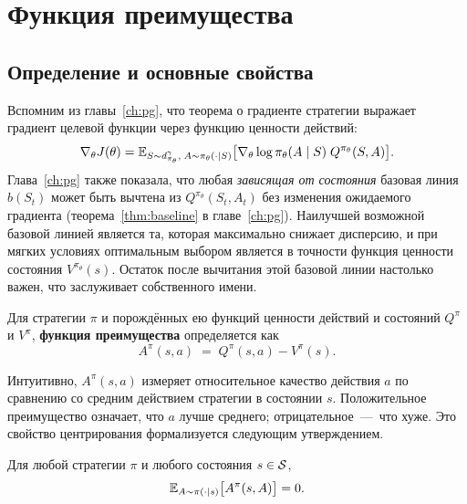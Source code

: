 \section{Функция преимущества}
\label{sec:advantage}

\subsection{Определение и основные свойства}

Вспомним из главы~\ref{ch:pg}, что теорема о градиенте стратегии выражает градиент целевой функции через функцию ценности действий:
\begin{equation}
\label{eq:pg-theorem-repeat}
\nabla_\theta J(\theta)
= \operatorname{\mathbb{E}}_{S \sim d^\gamma_{\pi_\theta},\; A \sim \pi_\theta(\cdot|S)}
  \bigl[\nabla_\theta \log \pi_\theta(A \mid S)\; Q^{\pi_\theta}(S, A)\bigr].
\end{equation}
Глава~\ref{ch:pg} также показала, что любая \emph{зависящая от состояния} базовая линия $b(S_t)$ может быть вычтена из $Q^{\pi_\theta}(S_t, A_t)$ без изменения ожидаемого градиента (теорема~\ref{thm:baseline} в главе~\ref{ch:pg}). Наилучшей возможной базовой линией является та, которая максимально снижает дисперсию, и при мягких условиях оптимальным выбором является в точности функция ценности состояния $V^{\pi_\theta}(s)$. Остаток после вычитания этой базовой линии настолько важен, что заслуживает собственного имени.

\begin{definition}
\label{def:advantage-ch9}
Для стратегии $\pi$ и порождённых ею функций ценности действий и состояний $Q^\pi$ и $V^\pi$, \textbf{функция преимущества} определяется как
\begin{equation}
\label{eq:advantage-def}
A^\pi(s, a) \;=\; Q^\pi(s, a) - V^\pi(s).
\end{equation}
\end{definition}

Интуитивно, $A^\pi(s,a)$ измеряет относительное качество действия $a$ по сравнению со средним действием стратегии в состоянии $s$. Положительное преимущество означает, что $a$ лучше среднего; отрицательное \,---\, что хуже. Это свойство центрирования формализуется следующим утверждением.

\begin{proposition}
\label{prop:advantage-zero-mean}
Для любой стратегии $\pi$ и любого состояния $s \in \mathcal{S}$,
\begin{equation}
\label{eq:advantage-zero-mean}
\operatorname{\mathbb{E}}_{A \sim \pi(\cdot|s)}\bigl[A^\pi(s, A)\bigr] = 0.
\end{equation}
\end{proposition}

